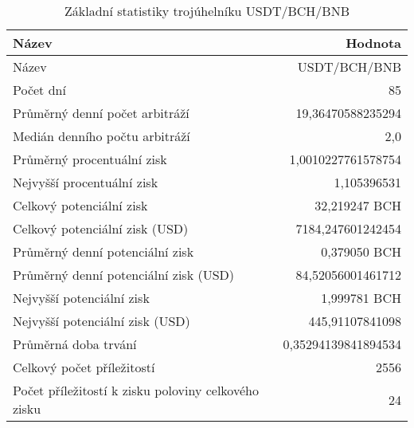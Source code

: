 \begin{table}\centering
\caption{Základní statistiky trojúhelníku USDT/BCH/BNB}
\label{USDTBCHBNB_stats}
\begin{tabular}{|| l | r ||}
\hline Název & Hodnota \\ 
\hline\hline Název & USDT/BCH/BNB \\ 
\hline Počet dní & 85 \\ 
\hline Průměrný denní počet arbitráží & 19,36470588235294 \\ 
\hline Medián denního počtu arbitráží & 2,0 \\ 
\hline Průměrný procentuální zisk & 1,0010227761578754 \\ 
\hline Nejvyšší procentuální zisk & 1,105396531 \\ 
\hline Celkový potenciální zisk & 32,219247 BCH \\ 
\hline Celkový potenciální zisk (USD) & 7184,247601242454 \\ 
\hline Průměrný denní potenciální zisk & 0,379050 BCH \\ 
\hline Průměrný denní potenciální zisk (USD) & 84,52056001461712 \\ 
\hline Nejvyšší potenciální zisk & 1,999781 BCH \\ 
\hline Nejvyšší potenciální zisk (USD) & 445,91107841098 \\ 
\hline Průměrná doba trvání & 0,35294139841894534 \\ 
\hline Celkový počet příležitostí & 2556 \\ 
\hline Počet příležitostí k zisku poloviny celkového zisku & 24 \\ 
\hline
\end{tabular}
\end{table}